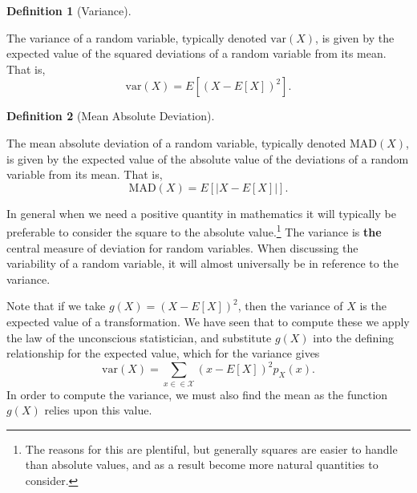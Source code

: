 \documentclass[
  letterpaper,
  DIV=11,
  numbers=noendperiod]{scrreprt}
\theoremstyle{definition}
\theoremstyle{definition}
\theoremstyle{definition}
\newtheorem{definition}{Definition}[chapter]
\theoremstyle{remark}
\begin{document}
\begin{definition}[Variance]\protect\hypertarget{def-variance}{}\label{def-variance}

The variance of a random variable, typically denoted \(\text{var}(X)\),
is given by the expected value of the squared deviations of a random
variable from its mean. That is,
\[\text{var}(X) = E\left[(X - E[X])^2\right].\]

\end{definition}

\begin{definition}[Mean Absolute
Deviation]\protect\hypertarget{def-MAD}{}\label{def-MAD}

The mean absolute deviation of a random variable, typically denoted
\(\text{MAD}(X)\), is given by the expected value of the absolute value
of the deviations of a random variable from its mean. That is,
\[\text{MAD}(X) = E\left[|X - E[X]|\right].\]

\end{definition}

In general when we need a positive quantity in mathematics it will
typically be preferable to consider the square to the absolute
value.\footnote{The reasons for this are plentiful, but generally
  squares are easier to handle than absolute values, and as a result
  become more natural quantities to consider.} The variance is
\textbf{the} central measure of deviation for random variables. When
discussing the variability of a random variable, it will almost
universally be in reference to the variance.

Note that if we take \(g(X) = (X-E[X])^2\), then the variance of \(X\)
is the expected value of a transformation. We have seen that to compute
these we apply the law of the unconscious statistician, and substitute
\(g(X)\) into the defining relationship for the expected value, which
for the variance gives
\[\text{var}(X) = \sum_{x\in\in\mathcal{X}} (x-E[X])^2p_X(x).\] In order
to compute the variance, we must also find the mean as the function
\(g(X)\) relies upon this value.
\end{document}
